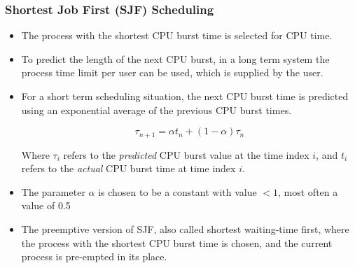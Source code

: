\documentclass{article}
\begin{document}
\subsubsection{Shortest Job First (SJF) Scheduling}
\begin{itemize}
    \item The process with the shortest CPU burst time is selected for CPU time. 
    
    \item To predict the length of the next CPU burst, in a long term system the process time limit per user can be used, which is supplied by the user. 
    
    \item For a short term scheduling situation, the next CPU burst time is predicted using an exponential average of the previous CPU burst times.
    
    \begin{equation}
        \tau_{n+1} = \alpha t_n + (1-\alpha) \tau_{n}
    \end{equation}
    
    Where $\tau_{i}$ refers to the \textit{predicted} CPU burst value at the time index $i$, and $t_i$ refers to the \textit{actual} CPU burst time at time index $i$.
    
    \item The parameter $\alpha$ is chosen to be a constant with value $< 1$, most often a value of 0.5
    
    \item The preemptive version of SJF, also called shortest waiting-time first, where the process with the shortest CPU burst time is chosen, and the current process is pre-empted in its place. 
\end{itemize}
\end{document}
